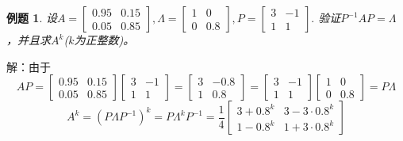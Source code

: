 \documentclass[a4paper]{book}
\newtheorem{eg}{例题}[chapter]
\begin{document}
\begin{eg}
设$A=\begin{bmatrix}0.95&0.15\\0.05&0.85\end{bmatrix},
\Lambda=\begin{bmatrix}1&0\\0&0.8\end{bmatrix},
P=\begin{bmatrix}3&-1\\1&1\end{bmatrix}.$
验证$P^{-1}AP=\Lambda$，并且求$A^k$($k$为正整数)。
\end{eg}
解：由于
\begin{equation*}
AP=\begin{bmatrix}0.95&0.15\\0.05&0.85\end{bmatrix}
\begin{bmatrix}3&-1\\1&1\end{bmatrix}=
\begin{bmatrix}3&-0.8\\1&0.8\end{bmatrix}=
\begin{bmatrix}3&-1\\1&1\end{bmatrix}
\begin{bmatrix}1&0\\0&0.8\end{bmatrix}
=P\Lambda
\end{equation*}
\begin{equation*}
A^k=(P\Lambda P^{-1})^k=P\Lambda^kP^{-1}=\frac{1}{4}
\begin{bmatrix}3+0.8^k&3-3\cdot0.8^k\\1-0.8^k&1+3\cdot0.8^k\end{bmatrix}
\end{equation*}
\end{document}

